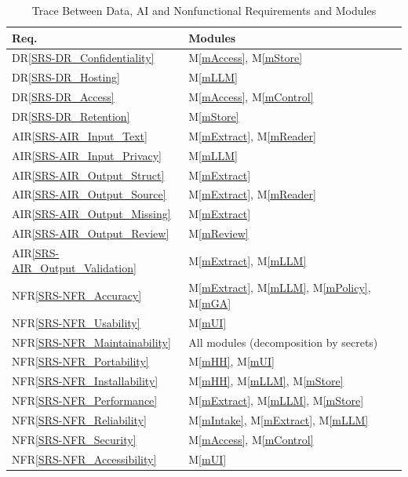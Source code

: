 \documentclass[12pt, titlepage]{article}
\newcommand{\mref}[1]{M\ref{#1}}
\newcommand{\nfrref}[1]{NFR\ref{SRS-#1}}
\newcommand{\drref}[1]{DR\ref{SRS-#1}}
\newcommand{\airref}[1]{AIR\ref{SRS-#1}}
\begin{document}
\begin{table}[H]
\centering
\begin{tabular}{p{} p{}}
\toprule
\textbf{Req.} & \textbf{Modules}\\
\midrule
\drref{DR_Confidentiality} & \mref{mAccess}, \mref{mStore}\\
\drref{DR_Hosting} & \mref{mLLM}\\
\drref{DR_Access} & \mref{mAccess}, \mref{mControl}\\
\drref{DR_Retention} & \mref{mStore}\\
\airref{AIR_Input_Text} & \mref{mExtract}, \mref{mReader}\\
\airref{AIR_Input_Privacy} & \mref{mLLM}\\
\airref{AIR_Output_Struct} & \mref{mExtract}\\
\airref{AIR_Output_Source} & \mref{mExtract}, \mref{mReader}\\
\airref{AIR_Output_Missing} & \mref{mExtract}\\
\airref{AIR_Output_Review} & \mref{mReview}\\
\airref{AIR_Output_Validation} & \mref{mExtract}, \mref{mLLM}\\
\nfrref{NFR_Accuracy} & \mref{mExtract}, \mref{mLLM}, \mref{mPolicy}, \mref{mGA}\\
\nfrref{NFR_Usability} & \mref{mUI}\\
\nfrref{NFR_Maintainability} & All modules (decomposition by secrets)\\
\nfrref{NFR_Portability} & \mref{mHH}, \mref{mUI}\\
\nfrref{NFR_Installability} & \mref{mHH}, \mref{mLLM}, \mref{mStore}\\
\nfrref{NFR_Performance} & \mref{mExtract}, \mref{mLLM}, \mref{mStore}\\
\nfrref{NFR_Reliability} & \mref{mIntake}, \mref{mExtract}, \mref{mLLM}\\
\nfrref{NFR_Security} & \mref{mAccess}, \mref{mControl}\\
\nfrref{NFR_Accessibility} & \mref{mUI}\\
\bottomrule
\end{tabular}
\caption{Trace Between Data, AI and Nonfunctional Requirements and Modules}
\label{TblRT2}
\end{table}
\end{document}
